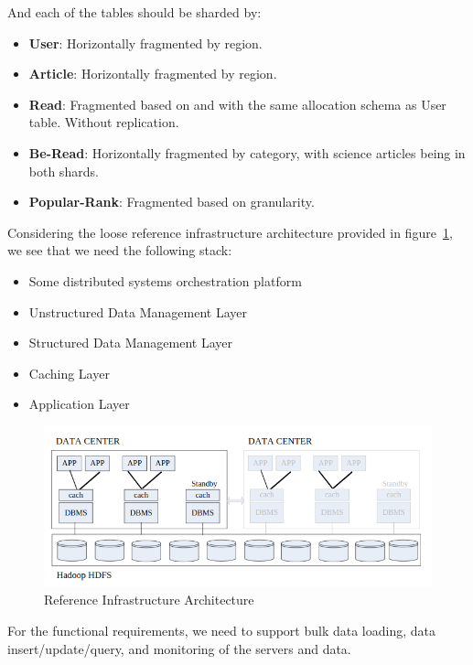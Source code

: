 \documentclass{report}
\begin{document}
    And each of the tables should be sharded by:

    \begin{itemize}
        \item \textbf{User}: Horizontally fragmented by region.
        \item \textbf{Article}: Horizontally fragmented by region.
        \item \textbf{Read}: Fragmented based on and with the same allocation schema as User table. Without replication.
        \item \textbf{Be-Read}: Horizontally fragmented by category, with science articles being in both shards.
        \item \textbf{Popular-Rank}: Fragmented based on granularity.
    \end{itemize}

    Considering the loose reference infrastructure architecture provided in figure~\ref{fig:reference-infrastructure-architecture}, we see that we need the following stack:

    \begin{itemize}
        \item Some distributed systems orchestration platform
        \item Unstructured Data Management Layer
        \item Structured Data Management Layer
        \item Caching Layer
        \item Application Layer
    \end{itemize}

    \begin{figure}[h]
        \centering
        \includegraphics[width=\textwidth]{images/reference-architecture}
        \caption{Reference Infrastructure Architecture}
        \label{fig:reference-infrastructure-architecture}
    \end{figure}

    For the functional requirements, we need to support bulk data loading, data insert/update/query, and monitoring of the servers and data.
\end{document}
